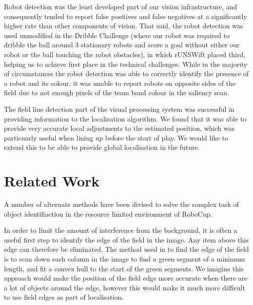 \documentclass[runningheads,a4paper]{llncs}
\begin{document}
Robot detection was the least developed part of our vision infrastructure, and consequently tended to report false positives and false negatives at a significantly higher rate than other components of vision. That said, the robot detection was used unmodified in the Dribble Challenge (where our robot was required to dribble the ball around 3 stationary robots and score a goal without either our robot or the ball touching the robot obstacles), in which rUNSWift placed third, helping us to achieve first place in the technical challenges. While in the majority of circumstances the robot detection was able to correctly identify the presence of a robot and its colour, it was unable to report robots on opposite sides of the field due to not enough pixels of the team band colour in the saliency scan.

The field line detection part of the visual processing system was successful in providing information to the localisation algorithm. We found that it was able to provide very accurate local adjustments to the estimated position, which was particuarly useful when lining up before the start of play. We would like to extend this to be able to provide global localisation in the future.

\section{Related Work}

A number of alternate methods have been divised to solve the complex task of object identifiaction in the resource limited environment of RoboCup.

In order to limit the amount of interference from the background, it is often a useful first step to identify the edge of the field in the image. Any item above this edge can therefore be eliminated. The method used in \cite{thomas09code} to find the edge of the field is to scan down each column in the image to find a green segment of a minimum length, and fit a convex hull to the start of the green segments. We imagine this approach would make the position of the field edge more accurate when there are a lot of objects around the edge, however this would make it much more difficult to use field edges as part of localisation.
\end{document}
